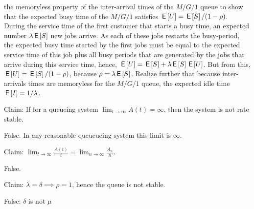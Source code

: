 \documentclass[stochastic-or.tex]{subfiles}
\begin{document}
 the memoryless property of the inter-arrival times of the $M/G/1$ queue to  show that the expected busy time of the $M/G/1$ satisfies $\,\mathsf{E}\left[U\right] = \,\mathsf{E}\left[S\right]/(1-\rho)$.
During the service time of the first customer that starts a busy time, an expected number $\lambda \,\mathsf{E}\left[S\right]$ new jobs arrive.
As each of these jobs restarts the busy-period, the expected busy time started by the first jobs must be equal to the expected service time of this job plus all busy periods that are generated by the jobs that arrive during this service time, hence, $\,\mathsf{E}\left[U\right] = \,\mathsf{E}\left[S\right] + \lambda \,\mathsf{E}\left[S\right] \,\mathsf{E}\left[U\right]$. But from this, $\,\mathsf{E}\left[U\right] = \,\mathsf{E}\left[S\right] / (1-\rho)$, because $\rho = \lambda \,\mathsf{E}\left[S\right]$.
Realize further that because inter-arrivals times are memoryless for the $M/G/1$ queue, the expected idle time $\,\mathsf{E}\left[I\right] = 1/\lambda$.

\begin{truefalse}
    Claim: If for a queueing system $\lim_{t\to\infty}A(t) = \infty$, then the system is not rate stable.
    \begin{solution}
        False. In any reasonable queueueing system this limit is $\infty$.
    \end{solution}
\end{truefalse}

\begin{truefalse}
    Claim:  $\lim_{t\to\infty}\frac{A(t)}{t}=\lim_{n\to\infty}\frac{A_n}{n}$.
    \begin{solution}
        False.
    \end{solution}
\end{truefalse}

\begin{truefalse}
    Claim: $\lambda = \delta \implies \rho = 1$, hence the queue is not stable.
    \begin{solution}
        False: $\delta$ is not $\mu$
    \end{solution}
\end{truefalse}
\end{document}
